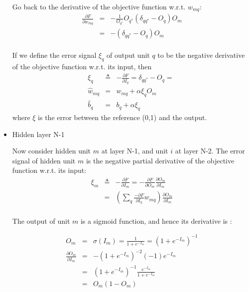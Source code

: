 \documentclass[9pt]{article}
\begin{document}
\begin{itemize}
Go back to the derivative of the objective function w.r.t. $w_{mq}$:
\begin{eqnarray*}
\frac{\partial F}{\partial w_{mq}} & = & - \frac{1}{O_{q^*}} O_{q^*} (\delta_{qq^*} - O_q) O_m \\
& = &  -(\delta_{qq^*} - O_q) O_m \\
\end{eqnarray*}


If we define 
the error signal $\xi_q $ of output unit $q$ to be the negative derivative of 
the objective function w.r.t. its input, then
\begin{eqnarray*}
\xi_q & \triangleq & - \frac{\partial F}{\partial I_q} = \delta_{qq^*} - O_q = \; \\
\hat{w}_{mq} & = &  w_{mq} + \alpha \xi_q  O_m \\
\hat{b}_{q} & = & b_q + \alpha \xi_q
\end{eqnarray*}
where $\xi$ is the error between the reference (0,1) and the output.

\item Hidden layer N-1

Now consider hidden unit $m$ at layer N-1, and unit $i$ at layer N-2.
The error signal of hidden unit $m$ is the negative partial derivative
of the objective function w.r.t. its input:
\begin{eqnarray*}
\xi_m & \triangleq & - \frac{\partial F}{\partial I_m} =  - \frac{\partial F}{\partial O_m} \frac{\partial O_m}{\partial I_m} \\
 & = & \left( \sum_q \frac{-\partial F}{\partial I_q} w_{mq} \right) \frac{\partial O_m}{\partial I_m} \\
\end{eqnarray*}

The output of unit $m$ is a sigmoid function, and hence its derivative is : 

\begin{eqnarray*}
O_m & = & \sigma(I_m) = \frac{1}{1+e^{-I_m}} = {(1+e^{-I_m})}^{-1}  \\
\frac{\partial O_m}{\partial I_m} & = & -{(1+e^{-I_m})}^{-2} (-1) e^{-I_m}  \\
& = & {(1+e^{-I_m})}^{-1}  \frac{e^{-I_m}}{1+e^{-I_m}} \\
& = & O_m (1 - O_m) \\
\end{eqnarray*}


\end{itemize}
\end{document}
